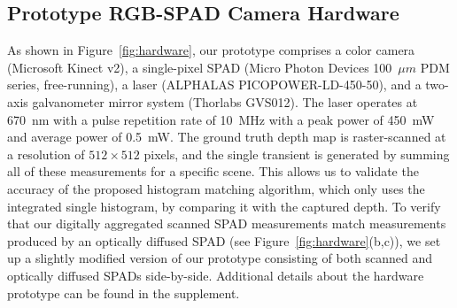 \subsection{Prototype RGB-SPAD Camera Hardware}
As shown in Figure~\ref{fig:hardware}, our prototype comprises a color camera
(Microsoft Kinect v2), a single-pixel SPAD (Micro Photon Devices 100~$\mu m$ PDM
series, free-running), a laser (ALPHALAS PICOPOWER-LD-450-50), and a two-axis
galvanometer mirror system (Thorlabs GVS012). The laser operates at 670~nm with
a pulse repetition rate of 10~MHz with a peak power of 450~mW and average power
of 0.5~mW. The ground truth depth map is raster-scanned at a resolution of
$512 \times 512$ pixels, and the single transient is generated by summing all of
these measurements for a specific scene. This allows us to validate the accuracy
of the proposed histogram matching algorithm, which only uses the integrated
single histogram, by comparing it with the captured depth. To verify that our
digitally aggregated scanned SPAD measurements match measurements produced by an
optically diffused SPAD (see Figure~\ref{fig:hardware}(b,c)), we set up a
slightly modified version of our prototype consisting of both scanned and
optically diffused SPADs side-by-side. Additional details about the hardware
prototype can be found in the supplement.


